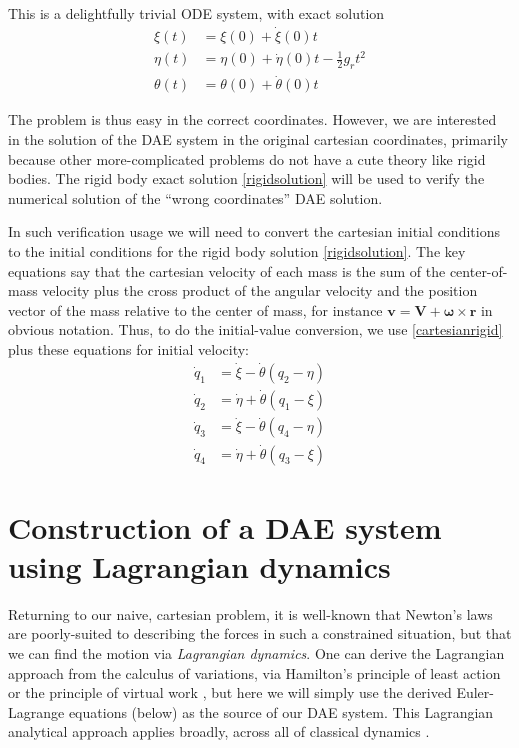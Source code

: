 \documentclass[letterpaper,final,12pt,reqno]{amsart}
\newcommand{\br}{\mathbf{r}}
\newcommand{\bv}{\mathbf{v}}
\newcommand{\bV}{\mathbf{V}}
\begin{document}
This is a delightfully trivial ODE system, with exact solution
\begin{subequations}
\label{rigidsolution}
\begin{align}
   \xi(t) &= \xi(0) + \dot\xi(0) t \\
  \eta(t) &= \eta(0) + \dot\eta(0) t - \frac{1}{2} g_r t^2 \\
\theta(t) &= \theta(0) + \dot\theta(0) t
\end{align}
\end{subequations}

The problem is thus easy in the correct coordinates.  However, we are interested in the solution of the DAE system in the original cartesian coordinates, primarily because other more-complicated problems do not have a cute theory like rigid bodies.  The rigid body exact solution \eqref{rigidsolution} will be used to verify the numerical solution of the ``wrong coordinates'' DAE solution.

In such verification usage we will need to convert the cartesian initial conditions to the initial conditions for the rigid body solution \eqref{rigidsolution}.  The key equations say that the cartesian velocity of each mass is the sum of the center-of-mass velocity plus the cross product of the angular velocity and the position vector of the mass relative to the center of mass, for instance $\bv = \bV + \bm{\omega}\times \br$ in obvious notation.  Thus, to do the initial-value conversion, we use \eqref{cartesianrigid} plus these equations for initial velocity:
\begin{subequations}
\label{velocitycartesianrigid}
\begin{align}
\dot q_1 &= \dot\xi - \dot\theta (q_2 - \eta) \\
\dot q_2 &= \dot\eta + \dot\theta (q_1 - \xi) \\
\dot q_3 &= \dot\xi - \dot\theta (q_4 - \eta) \\
\dot q_4 &= \dot\eta + \dot\theta (q_3 - \xi)
\end{align}
\end{subequations}


\section{Construction of a DAE system using Lagrangian dynamics}

Returning to our naive, cartesian problem, it is well-known that Newton's laws are poorly-suited to describing the forces in such a constrained situation, but that we can find the motion via \emph{Lagrangian dynamics}.  One can derive the Lagrangian approach from the calculus of variations, via Hamilton's principle of least action or the principle of virtual work \cite{Lanczos1970}, but here we will simply use the derived Euler-Lagrange equations (below) as the source of our DAE system.  This Lagrangian analytical approach applies broadly, across all of classical dynamics \cite{Layton1998}.
\end{document}
